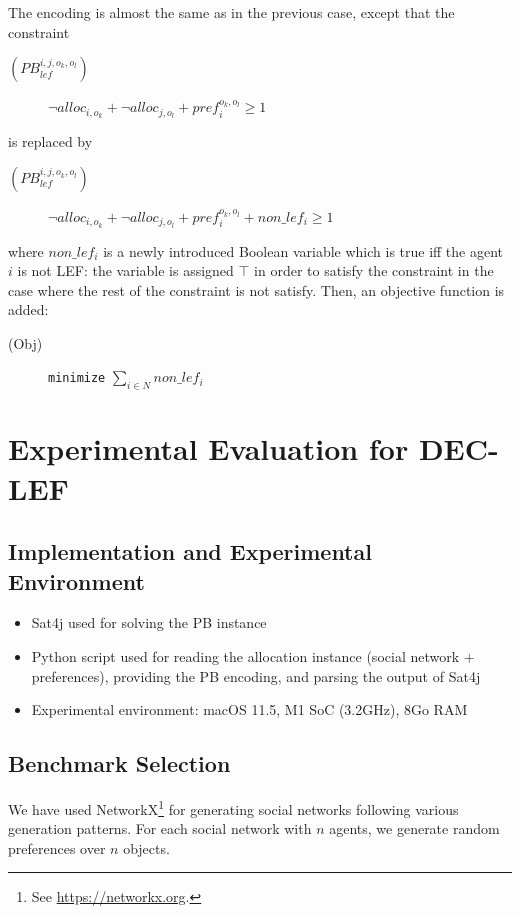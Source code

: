 \documentclass{article}
\begin{document}
The encoding is almost the same as in the previous case, except that the constraint
\begin{description}
	\item[$(PB_{lef}^{i,j,o_k,o_l})$] $\neg alloc_{i,o_k} + \neg alloc_{j,o_l} + pref_i^{o_k,o_l} \geq 1$
\end{description}
is replaced by
\begin{description}
	\item[$(PB_{lef}^{i,j,o_k,o_l})$] $\neg alloc_{i,o_k} + \neg alloc_{j,o_l} + pref_i^{o_k,o_l} + non\_lef_i \geq 1$
\end{description}
where $non\_lef_i$ is a newly introduced Boolean variable which is true iff the agent $i$ is not LEF: the variable is assigned $\top$ in order to satisfy the constraint in the case where the rest of the constraint is not satisfy. Then, an objective function is added:
\begin{description}
	\item[(Obj)] \verb+minimize+ $\sum_{i \in N} non\_lef_i$
\end{description}

\section{Experimental Evaluation for DEC-LEF}\label{section:expe-dec-lef}
\subsection{Implementation and Experimental Environment}
\begin{itemize}
	\item Sat4j \cite{BerreP10} used for solving the PB instance
	\item Python script used for reading the allocation instance (social network $+$ preferences), providing the PB encoding, and parsing the output of Sat4j
	\item Experimental environment: macOS 11.5, M1 SoC (3.2GHz), 8Go RAM
\end{itemize}

\subsection{Benchmark Selection}
We have used NetworkX\footnote{See \url{https://networkx.org}.} for generating social networks following various generation patterns. For each social network with $n$ agents, we generate random preferences over $n$ objects.
\end{document}
